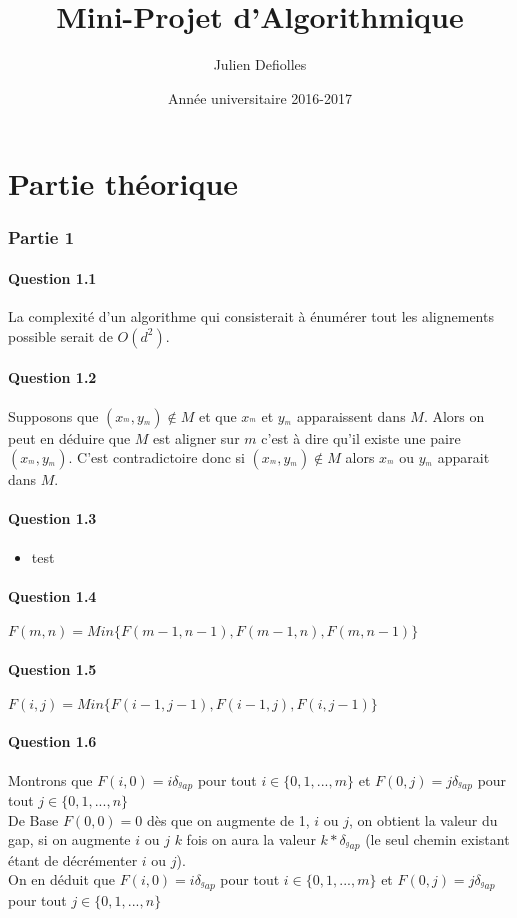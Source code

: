 \documentclass[5pt,a4paper]{report}
\title{Mini-Projet d’Algorithmique}
\author{Julien Defiolles}
\date{Année universitaire 2016-2017}
\begin{document}
	\maketitle
	\part{Partie théorique}
	\section*{Partie 1}
	\subsection*{Question 1.1}
	La complexité d'un algorithme  qui consisterait à énumérer tout les alignements possible serait de $O(d^2)$.
	\subsection*{Question 1.2}
	Supposons que $(x_{^m},y_{^m})\notin M$ et que $x_{^m}$ et $ y_{^m}$ apparaissent dans $M$.
	Alors on peut en déduire que $M$ est aligner sur $m$ c'est à dire qu'il existe une paire $(x_{^m},y_{^m})$. C'est contradictoire donc si $(x_{^m},y_{^m})\notin M$ alors $x_{^m}$ ou $ y_{^m}$ apparait dans $M$.
	\subsection*{Question 1.3}
	\begin{itemize}
		\item test
	\end{itemize}
	\subsection*{Question 1.4}
	$F(m,n) = Min\{F(m-1,n-1),F(m-1,n),F(m,n-1)\}$
	
	\subsection*{Question 1.5}
	$F(i,j) = Min\{F(i-1,j-1),F(i-1,j),F(i,j-1)\}$
	
	\subsection*{Question 1.6}
	Montrons que $F(i,0) = i\delta_{^gap}$ pour tout $i\in \{0,1,...,m\}$ et $F(0,j) = j\delta_{^gap}$ pour tout $j\in \{0,1,...,n\}$\\
	De Base $F(0,0) = 0$ dès que on augmente de 1, $i$ ou $j$, on obtient la valeur du gap, si on augmente $i$ ou $j$ $k$ fois on aura la valeur $k*\delta_{^gap}$ (le seul chemin existant étant de décrémenter $i$ ou $j$).\\ On en déduit que $F(i,0) = i\delta_{^gap}$ pour tout $i\in \{0,1,...,m\}$ et $F(0,j) = j\delta_{^gap}$ pour tout $j\in \{0,1,...,n\}$
	
\end{document}

